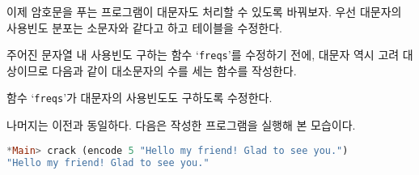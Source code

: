 이제 암호문을 푸는 프로그램이 대문자도 처리할 수 있도록 바꿔보자. 우선
대문자의 사용빈도 분포는 소문자와 같다고 하고 테이블을 수정한다.

주어진 문자열 내 사용빈도 구하는 함수 `\texttt{freqs}'를 수정하기 전에, 대문자
역시 고려 대상이므로 다음과 같이 대소문자의 수를 세는 함수를 작성한다.

함수 `\texttt{freqs}'가 대문자의 사용빈도도 구하도록 수정한다.

나머지는 이전과 동일하다. 다음은 작성한 프로그램을 실행해 본 모습이다.
\begin{lstlisting}[language=Haskell]
*Main> crack (encode 5 "Hello my friend! Glad to see you.")
"Hello my friend! Glad to see you."
\end{lstlisting}







